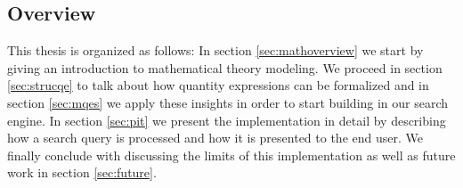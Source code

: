 

\subsection{Overview}

This thesis is organized as follows: In section \ref{sec:mathoverview} we start by giving an introduction to mathematical theory modeling. We proceed in section \ref{sec:strucqe} to talk about how quantity expressions can be formalized and in section \ref{sec:mqes} we apply these insights in order to start building in our search engine. In section \ref{sec:pit} we present the implementation in detail by describing how a search query is processed and how it is presented to the end user. We finally conclude with discussing the limits of this implementation as well as future work in section \ref{sec:future}.
